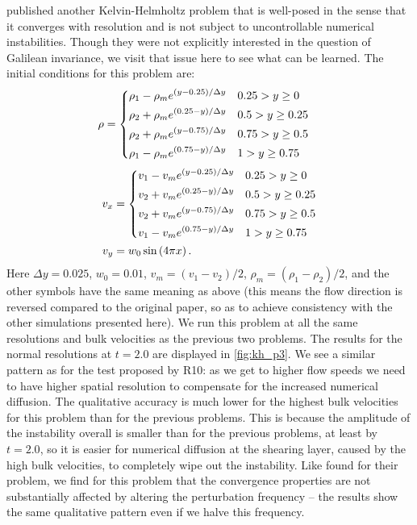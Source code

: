 \documentclass[12pt]{article}
\begin{document}
\citet{mcnally:2012} published another Kelvin-Helmholtz problem that
is well-posed in the sense that it converges with resolution and
is not subject to uncontrollable numerical instabilities. Though they
were not explicitly interested in the question of Galilean invariance,
we visit that issue here to see what can be learned. The initial
conditions for this problem are:
\begin{align}
  \rho &= \begin{dcases} \rho_1 - \rho_m e^{(y-0.25)/\Delta y} & 0.25 > y \geq 0 \\
                         \rho_2 + \rho_m e^{(0.25-y)/\Delta y} & 0.5 > y \geq 0.25 \\
                         \rho_2 + \rho_m e^{(y-0.75)/\Delta y} & 0.75 > y \geq 0.5 \\
                         \rho_1 - \rho_m e^{(0.75-y)/\Delta y} & 1 > y \geq 0.75 \end{dcases} \label{eq:kh_p3_rho}
\end{align}
\begin{align}
  v_x &= \begin{dcases} v_1 - v_m e^{(y-0.25)/\Delta y} & 0.25 > y \geq 0 \\
                        v_2 + v_m e^{(0.25-y)/\Delta y} & 0.5 > y \geq 0.25 \\
                        v_2 + v_m e^{(y-0.75)/\Delta y} & 0.75 > y \geq 0.5 \\
                        v_1 - v_m e^{(0.75-y)/\Delta y} & 1 > y \geq 0.75 \end{dcases} \label{eq:kh_p3_vx} \\
  v_y &= w_0\, \text{sin}\left(4\pi x\right). \label{eq:kh_p3_vy}
\end{align}
Here $\Delta y = 0.025$, $w_0 = 0.01$, $v_m = (v_1 - v_2) / 2$, $\rho_m = (\rho_1 - \rho_2) / 2$,
and the other symbols have the same meaning as above (this means the flow direction
is reversed compared to the original paper, so as to achieve consistency with the
other simulations presented here). We run this problem at all the same resolutions
and bulk velocities as the previous two problems. The results for the normal resolutions
at $t = 2.0$ are displayed in \autoref{fig:kh_p3}. We see a similar pattern as for
the test proposed by R10: as we get to higher flow speeds we need to have higher
spatial resolution to compensate for the increased numerical diffusion. The
qualitative accuracy is much lower for the highest bulk velocities for this problem
than for the previous problems. This is because the amplitude of the instability overall
is smaller than for the previous problems, at least by $t = 2.0$, so it is easier
for numerical diffusion at the shearing layer, caused by the high bulk velocities,
to completely wipe out the instability. Like \citet{robertson:2010} found for
their problem, we find for this problem that the convergence properties are not
substantially affected by altering the perturbation frequency -- the results
show the same qualitative pattern even if we halve this frequency.
\end{document}
